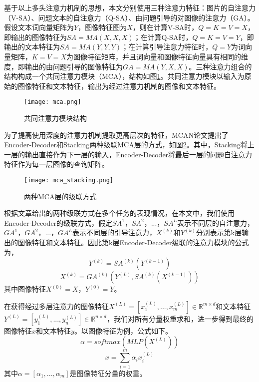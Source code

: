 基于以上多头注意力机制的思想，本文分别使用三种注意力特征：图片的自注意力（V-SA）、问题文本的自注意力（Q-SA）、由问题引导的对图像的注意力（GA）。假设文本词向量矩阵为$Y$，图像特征图为$X$，则在计算V-SA时，$Q = K = V = X$，即输出的图像特征为$SA=MA(X, X, X)$；在计算Q-SA时，$Q = K = V = Y$，即输出的文本特征为$SA=MA(Y, Y, Y)$；在计算引导注意力特征时，$Q = Y$为词向量矩阵，$K = V = X$为图像特征矩阵，并且词向量和图像特征向量具有相同的维度，即输出的由问题引导的图像特征为$GA=MA(Y, X, X)$。三种注意力组合的结构构成一个共同注意力模块（MCA），结构如图\ref{mca}。共同注意力模块以输入为原始的图像特征和文本特征，输出为经过注意力机制的图像和文本特征。
\begin{figure}[H]
	\texttt{[image: mca.png]}
	\caption{共同注意力模块结构}
	\label{mca}
\end{figure}

为了提高使用深度的注意力机制提取更高层次的特征，MCAN论文提出了Encoder-Decoder和Stacking两种级联MCA层的方式，如图\ref{mca_stacking}。其中，Stacking将上一层的输出直接作为下一层的输入，Encoder-Decoder将最后一层的问题自注意力特征作为每一层图像的查询矩阵。
\begin{figure}[H]
	\texttt{[image: mca\_stacking.png]}
	\caption{两种MCA层的级联方式}
	\label{mca_stacking}
\end{figure}

根据文章给出的两种级联方式在多个任务的表现情况，在本文中，我们使用Encoder-Decoder的级联方式，假定$SA^1$，$SA^2$，...，$SA^L$表示不同层的自注意力，$GA^1$，$GA^2$，...，$GA^L$表示不同层的引导注意力，$X^{(k)}$和$Y^{(k)}$分别表示第k层输出的图像特征和文本特征。因此第k层Encoder-Decoder级联的注意力模块的公式为，
\begin{equation}
Y^{(k)} = SA^{(k)}(Y^{(k-1)})
\end{equation}
\begin{equation}
X^{(k)} = GA^{(k)}(Y^{(L)}, SA^{(k)}(X^{(k-1)}))
\end{equation}
其中图像特征$X^{(0)}=X$，$Y^{(0)}=Y$。

在获得经过多层注意力的图像特征$X^{(L)}=[x^{(L)}_1,...,x^{(L)}_m]\in\mathbb{R}^{m \times d}$和文本特征$Y^{(L)}=[y^{(L)}_1,...,y^{(L)}_n]\in\mathbb{R}^{n \times d}$，我们对所有分量权重求和，进一步得到最终的图像特征$x$和文本特征$y$。以图像特征为例，公式如下。
\begin{equation}
\alpha = softmax(MLP(X^{(L)}))
\end{equation}
\begin{equation}
x = \sum_{i=1}^m \alpha_i x_i^{(L)}
\end{equation}
其中$\alpha = [\alpha_1,...,\alpha_m]$是图像特征分量的权重。

